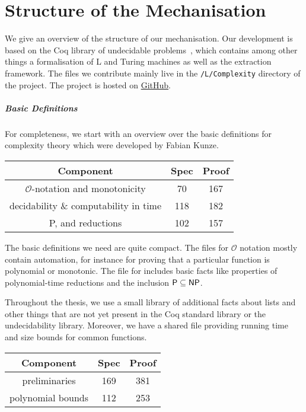 \chapter{Structure of the Mechanisation}\label{app:mecha}
We give an overview of the structure of our mechanisation. Our development is based on the Coq library of undecidable problems~\cite{coq_undec}, which contains among other things a formalisation of L and Turing machines as well as the extraction framework. 
The files we contribute mainly live in the \texttt{/L/Complexity} directory of the project.
The project is hosted on \href{https://github.com/uds-psl/ba-gaeher}{GitHub}.

\paragraph{Basic Definitions}
For completeness, we start with an overview over the basic definitions for complexity theory which were developed by Fabian Kunze. 
\begin{center}
  \begin{tabular}{ccc}
    Component & Spec & Proof \\
    \midrule
    $\mathcal{O}$-notation and monotonicity & 70 & 167  \\ %
    decidability \& computability in time & 118 & 182 \\ %
    \textsf{P}, \NP{} and reductions & 102 & 157 %
  \end{tabular}
\end{center}
The basic definitions we need are quite compact. The files for $\mathcal{O}$ notation mostly contain automation, for instance for proving that a particular function is polynomial or monotonic.
The file for \NP{} includes basic facts like properties of polynomial-time reductions and the inclusion $\textsf{P} \subseteq \textsf{NP}{}$.

Throughout the thesis, we use a small library of additional facts about lists and other things that are not yet present in the Coq standard library or the undecidability library. 
Moreover, we have a shared file providing running time and size bounds for common functions.
\begin{center}
  \begin{tabular}{ccc}
    Component & Spec & Proof \\
    \midrule
    preliminaries & 169 & 381 \\
    polynomial bounds & 112 & 253
  \end{tabular}
\end{center}

